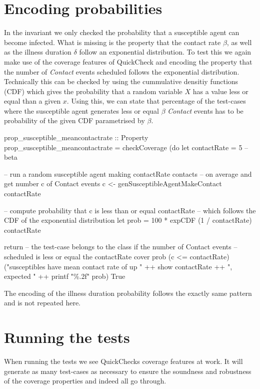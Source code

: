 \section{Encoding probabilities}
In the invariant we only checked the probability that a susceptible agent can become infected. What is missing is the property that the contact rate $\beta$, as well as the illness duration $\delta$ follow an exponential distribution. To test this we again make use of the coverage features of QuickCheck and encoding the property that the number of \textit{Contact} events scheduled follows the exponential distribution. Technically this can be checked by using the cummulative densitiy functions (CDF) which gives the probability that a random variable $X$ has a value less or equal than a given $x$. Using this, we can state that percentage of the test-cases where the susceptible agent generates less or equal $\beta$ \textit{Contact} events has to be probability of the given CDF parametrised by $\beta$.

\begin{HaskellCode}
prop_susceptible_meancontactrate :: Property
prop_susceptible_meancontactrate = checkCoverage (do
  let contactRate = 5 -- beta
  
  -- run a random susceptible agent making contactRate contacts
  -- on average and get number c of Contact events
  c <- genSusceptibleAgentMakeContact contactRate

  -- compute probability that c is less than or equal contactRate
  -- which follows the CDF of the exponential distribution
  let prob = 100 * expCDF (1 / contactRate) contactRate

  return
    -- the test-case belongs to the class if the number of Contact events
    -- scheduled is less or equal the contactRate
    cover prob (c <= contactRate) 
      ("susceptibles have mean contact rate of up " ++ show contactRate ++ 
        ", expected " ++ printf "\%.2f" prob)  True
\end{HaskellCode}

The encoding of the illness duration probability follows the exactly same pattern and is not repeated here.

\section{Running the tests}
When running the tests we see QuickChecks coverage features at work. It will generate as many test-cases as necessary to ensure the soundness and robustness of the coverage properties and indeed all go through.

